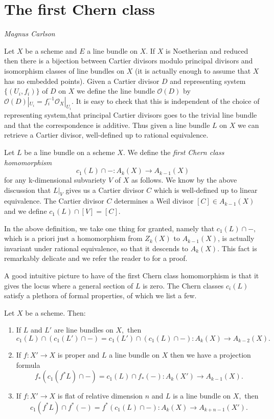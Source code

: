 \documentclass[a4paper,openany]{scrbook}
\newcommand{\chapterauthor}[1]{\hfill\emph{#1}\par\noindent}
\begin{document}
\section{The first Chern class} \label{sec:firstchern}
\chapterauthor{Magnus Carlson}

Let $X$ be a scheme and $E$ a line bundle on $X.$ If $X$ is Noetherian and reduced then there is a bijection between Cartier divisors modulo principal divisors  and isomorphism classes of line bundles on $X$ (it is actually enough to assume that $X$ has no embedded points). Given a Cartier divisor $D$ and representing system $ \{(U_i,f_i)\}$ of $D$ on $X$ we define the line bundle $\mathcal{O}(D)$ by $\mathcal{O}(D)|_{U_i} = f^{-1}_i \mathcal{O}_{X}|_{U_i}.$ It is easy to check that this is independent of the choice of representing system,that principal Cartier divisors goes to the trivial line bundle and that the correspondence is additive.  Thus given a line bundle $L$ on $X$ we can retrieve a Cartier divisor, well-defined up to rational equivalence. 
\begin{defn}
Let $L$ be a line bundle on a scheme $X.$ We define the \emph{first Chern class homomorphism}
\[
c_1(L) \cap -: A_k(X) \rightarrow A_{k-1}(X)
\]
for any k-dimensional subvariety $V$ of $X$ as follows. We know by the above discussion that $L|_V$ gives us a Cartier divisor $C$ which is well-defined up to linear equivalence. The Cartier divisor $C$ determines a Weil divisor $[C] \in A_{k-1}(X)$ and we define $c_1(L) \cap [V] = [C].$ 
\end{defn}
In the above definition, we take one thing for granted, namely that $c_1(L) \cap -,$ which is a priori just a homomorphism from $Z_k(X)$ to $A_{k-1}(X)$, is actually invariant under rational equivalence, so that it descends to $A_k(X).$ This fact is remarkably delicate and we refer the reader to \cite[2.5]{fulton:intersection-theory} for a proof.

A good intuitive picture to have of the first Chern class homomorphism is that it gives the locus where a general section of $L$ is zero. The Chern classes $c_i(L)$ satisfy a plethora of formal properties, of which we list a few. 

\begin{thm} \label{thm:firstchernclassprops}
Let $X$ be a scheme. Then:
\begin{enumerate}
\item \label{thm:firstchernclassprops:commutative} If $L$ and $L'$ are line bundles on $X,$ then
\[
c_1(L) \cap (c_1(L') \cap - ) = c_1(L') \cap (c_1(L) \cap - ) : A_k(X) \rightarrow A_{k-2}(X).
\]
\item If $f\colon X' \rightarrow X$ is proper and $L$ a line bundle on $X$ then we have a projection formula 
\[
f_\ast(c_1(f^\ast L) \cap -) = c_1(L) \cap f_\ast(-):A_k(X') \rightarrow A_{k-1}(X).
\]
\item If $f\colon X' \rightarrow X$ is flat of relative dimension $n$ and $L$ is a line bundle on $X,$ then \[
c_1(f^\ast L) \cap f^\ast(-) = f^\ast(c_1(L) \cap -):A_k(X) \rightarrow A_{k+n-1}(X').
\]
\end{enumerate}
\end{thm} 
\end{document}
